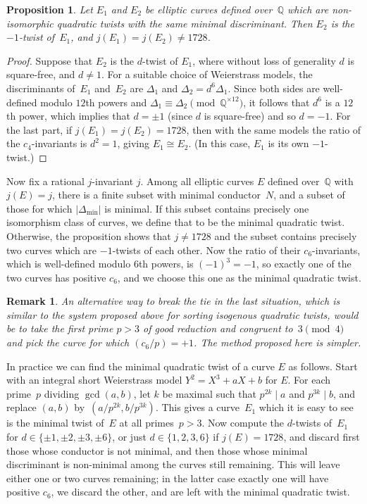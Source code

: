 \documentclass{article}
\newtheorem{prop}[thm]{Proposition}
\newtheorem{rem}[thm]{Remark}
\def\Q{{\mathbb Q}}
\begin{document}
\begin{prop} Let $E_1$ and $E_2$ be elliptic curves defined over~$\Q$
  which are non-isomorphic quadratic twists with the same minimal
  discriminant.  Then $E_2$ is the $-1$-twist of~$E_1$, and
  $j(E_1)=j(E_2)\not=1728$.
\end{prop}
\begin{proof}
Suppose that $E_2$ is the $d$-twist of $E_1$, where without loss of
generality $d$ is square-free, and $d\not=1$.  For a suitable choice
of Weierstrass models, the discriminants of~$E_1$ and~$E_2$ are
$\Delta_1$ and $\Delta_2=d^6\Delta_1$.  Since both sides are
well-defined modulo $12$th powers and
$\Delta_1\equiv\Delta_2\pmod{\Q^{\times 12}}$, it follows that $d^6$ is a
$12$th power, which implies that $d=\pm1$ (since $d$ is square-free)
and so $d=-1$.  For the last part, if $j(E_1)=j(E_2)=1728$, then with
the same models the ratio of the $c_4$-invariants is $d^2=1$, giving
$E_1\cong E_2$.  (In this case, $E_1$ is its own $-1$-twist.)
\end{proof}

Now fix a rational $j$-invariant $j$.  Among all elliptic curves $E$
defined over~$\Q$ with $j(E)=j$, there is a finite subset with minimal
conductor~$N$, and a subset of those for which
$\left|\Delta_{\text{min}}\right|$ is minimal.  If this subset
contains precisely one isomorphism class of curves, we define that to
be the minimal quadratic twist.  Otherwise, the proposition shows that
$j\not=1728$ and the subset contains precisely two curves which are
$-1$-twists of each other.  Now the ratio of their $c_6$-invariants,
which is well-defined modulo $6$th powers, is $(-1)^3=-1$, so exactly
one of the two curves has positive $c_6$, and we choose this one as
the minimal quadratic twist.

\begin{rem}
An alternative way to break the tie in the last situation, which is
similar to the system proposed above for sorting isogenous quadratic
twists, would be to take the first prime $p>3$ of good reduction and
congruent to~$3\pmod4$ and pick the curve for which $(c_6/p)=+1$.  The
method proposed here is simpler.
\end{rem}

In practice we can find the minimal quadratic twist of a curve $E$ as
follows.  Start with an integral short Weierstrass model
$Y^2=X^3+aX+b$ for $E$.  For each prime~$p$ dividing $\gcd(a,b)$, let
$k$ be maximal such that $p^{2k}\mid a$ and $p^{3k}\mid b$, and
replace $(a,b)$ by~$(a/p^{2k},b/p^{3k})$.  This gives a curve~$E_1$
which it is easy to see is the minimal twist of~$E$ at all
primes~$p>3$.  Now compute the $d$-twists of~$E_1$ for
$d\in\{\pm1,\pm2,\pm3,\pm6\}$, or just $d\in\{1,2,3,6\}$ if
$j(E)=1728$, and discard first those whose conductor is not minimal,
and then those whose minimal discriminant is non-minimal among the
curves still remaining. This will leave either one or two curves
remaining; in the latter case exactly one will have positive $c_6$, we
discard the other, and are left with the minimal quadratic twist.
\end{document}
